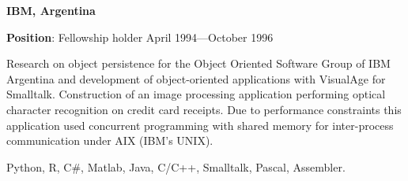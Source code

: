 \documentclass{article}
\begin{document}
\par
\vspace{.1in}
{\bf IBM, Argentina}
\par
{\bf Position}:  Fellowship holder  \hfill April 1994---October 1996
\par
Research on object persistence for the Object Oriented Software Group of IBM Argentina and development of object-oriented applications with VisualAge for Smalltalk.
Construction of an image processing application performing optical
character recognition on credit card receipts. Due to performance constraints
this application used concurrent programming with shared memory for
inter-process communication under AIX (IBM's UNIX).

\vspace{2\baselineskip}
Python, R, C\#, Matlab, Java, C/C++, Smalltalk, Pascal, Assembler.
\par
{}
\par
\end{document}
